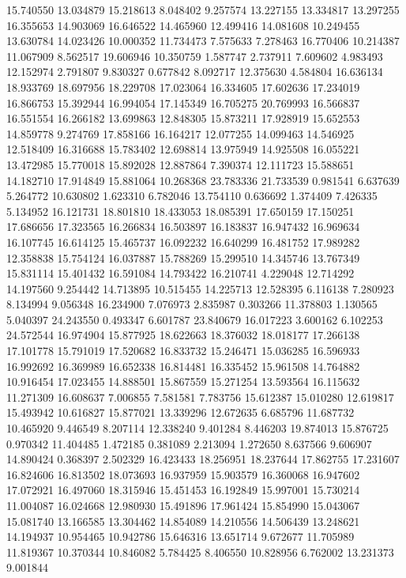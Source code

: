 15.740550
13.034879
15.218613
8.048402
9.257574
13.227155
13.334817
13.297255
16.355653
14.903069
16.646522
14.465960
12.499416
14.081608
10.249455
13.630784
14.023426
10.000352
11.734473
7.575633
7.278463
16.770406
10.214387
11.067909
8.562517
19.606946
10.350759
1.587747
2.737911
7.609602
4.983493
12.152974
2.791807
9.830327
0.677842
8.092717
12.375630
4.584804
16.636134
18.933769
18.697956
18.229708
17.023064
16.334605
17.602636
17.234019
16.866753
15.392944
16.994054
17.145349
16.705275
20.769993
16.566837
16.551554
16.266182
13.699863
12.848305
15.873211
17.928919
15.652553
14.859778
9.274769
17.858166
16.164217
12.077255
14.099463
14.546925
12.518409
16.316688
15.783402
12.698814
13.975949
14.925508
16.055221
13.472985
15.770018
15.892028
12.887864
7.390374
12.111723
15.588651
14.182710
17.914849
15.881064
10.268368
23.783336
21.733539
0.981541
6.637639
5.264772
10.630802
1.623310
6.782046
13.754110
0.636692
1.374409
7.426335
5.134952
16.121731
18.801810
18.433053
18.085391
17.650159
17.150251
17.686656
17.323565
16.266834
16.503897
16.183837
16.947432
16.969634
16.107745
16.614125
15.465737
16.092232
16.640299
16.481752
17.989282
12.358838
15.754124
16.037887
15.788269
15.299510
14.345746
13.767349
15.831114
15.401432
16.591084
14.793422
16.210741
4.229048
12.714292
14.197560
9.254442
14.713895
10.515455
14.225713
12.528395
6.116138
7.280923
8.134994
9.056348
16.234900
7.076973
2.835987
0.303266
11.378803
1.130565
5.040397
24.243550
0.493347
6.601787
23.840679
16.017223
3.600162
6.102253
24.572544
16.974904
15.877925
18.622663
18.376032
18.018177
17.266138
17.101778
15.791019
17.520682
16.833732
15.246471
15.036285
16.596933
16.992692
16.369989
16.652338
16.814481
16.335452
15.961508
14.764882
10.916454
17.023455
14.888501
15.867559
15.271254
13.593564
16.115632
11.271309
16.608637
7.006855
7.581581
7.783756
15.612387
15.010280
12.619817
15.493942
10.616827
15.877021
13.339296
12.672635
6.685796
11.687732
10.465920
9.446549
8.207114
12.338240
9.401284
8.446203
19.874013
15.876725
0.970342
11.404485
1.472185
0.381089
2.213094
1.272650
8.637566
9.606907
14.890424
0.368397
2.502329
16.423433
18.256951
18.237644
17.862755
17.231607
16.824606
16.813502
18.073693
16.937959
15.903579
16.360068
16.947602
17.072921
16.497060
18.315946
15.451453
16.192849
15.997001
15.730214
11.004087
16.024668
12.980930
15.491896
17.961424
15.854990
15.043067
15.081740
13.166585
13.304462
14.854089
14.210556
14.506439
13.248621
14.194937
10.954465
10.942786
15.646316
13.651714
9.672677
11.705989
11.819367
10.370344
10.846082
5.784425
8.406550
10.828956
6.762002
13.231373
9.001844
